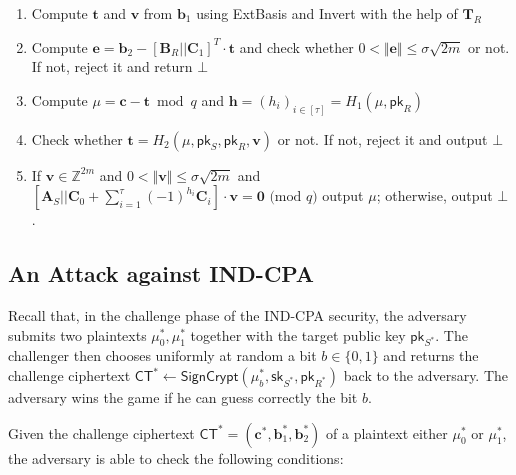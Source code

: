 \documentclass[a4paper,11pt,onecolumn]{elsarticle}
\begin{document}
\begin{itemize}
\begin{enumerate}
				\item Compute $\mathbf{t}$ and $\mathbf{v}$ from $\mathbf{b}_1$ using \textsf{ExtBasis} and \textsf{Invert} with the help of $\mathbf{T}_R$
				\item Compute $\mathbf{e}=\mathbf{b}_2-[\mathbf{B}_R||\mathbf{C}_1]^{T}\cdot \mathbf{t}$ and check whether $0<\Vert \mathbf{e}\Vert \leq \sigma\sqrt{2m}$ or not. If not, reject it and return  $\bot$
				\item Compute $\mu=\mathbf{c} - \mathbf{t} \bmod q$ and $\mathbf{h}=(h_i)_{i\in[\tau]} =H_1(\mu, \textsf{pk}_R)$
				\item Check whether $\mathbf{t} =H_2(\mu, \textsf{pk}_S, \textsf{pk}_R, \mathbf{v})$ or not. If not, reject it and output $\bot$
				 \item If {$\mathbf{v}\in \mathbb{Z}^{2m}$ and $0<\Vert \mathbf{v} \Vert \leq \sigma \sqrt{2m}$ and $[\mathbf{A}_S|| \mathbf{C}_0+\sum_{i=1}^{\tau} (-1)^{h_i}\mathbf{C}_i]\cdot \mathbf{v}= \mathbf{0} \text{ (mod } q)$}
				output $\mu$; otherwise, output $\bot$.
			\end{enumerate}

			\end{itemize}



\subsection{An Attack against IND-CPA}	
Recall that, in the challenge phase of the IND-CPA security, the adversary submits two plaintexts $\mu^*_0, \mu^*_1$ together with the target public  key $\textsf{pk}_{S^*}$. The challenger  then chooses uniformly at random a bit $b \in \{0,1\}$ and returns the challenge ciphertext $\textsf{CT}^* \leftarrow \textsf{SignCrypt}(\mu^*_b, \mathsf{sk}_{S^*}, \mathsf{pk}_{R^*})$ back to the adversary. The adversary wins the game if he can guess correctly the bit $b$.

\iffalse 

The adversary also knows  public parameters $\textbf{C}_0,...,\textbf{C}_\tau$  and $H_1,
H_2$.
\fi 

 Given the challenge ciphertext $\textsf{CT}^* = (\textbf{c}^*, \textbf{b}^*_1, \textbf{b}^*_2)$ of a plaintext either $\mu^*_0 $ or
$\mu^*_1$, the adversary is able to check the following conditions:
\end{document}

